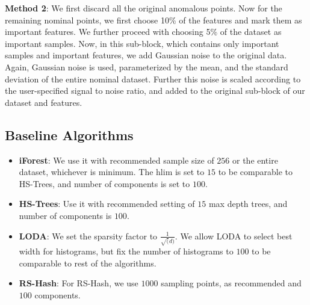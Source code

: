 \textbf{Method 2}: We first discard all the original anomalous points. Now for the remaining nominal points, we first choose 10\% of the features and mark them as important features. We further proceed with choosing 5\% of the dataset as important samples. Now, in this sub-block, which contains only important samples and important features, we add Gaussian noise to the original data. Again, Gaussian noise is used, parameterized by the mean, and the standard deviation of the entire nominal dataset. Further this noise is scaled according to the user-specified signal to noise ratio, and added to the original sub-block of our dataset and features.

\subsection{Baseline Algorithms}
\begin{itemize}
\item{\textbf{iForest}: We use it with recommended sample size of $256$ or the entire dataset, whichever is minimum. The hlim is set to $15$ to be comparable to HS-Trees, and number of components is set to $100$.}
\item{\textbf{HS-Trees}:  Use it with recommended setting of $15$ max depth trees, and number of components is $100$.}
\item{\textbf{LODA}: We set the sparsity factor to $\frac{1}{\sqrt(d)}$. We allow LODA to select best width for histograms, but fix the number of histograms to $100$ to be comparable to rest of the algorithms.}
\item{\textbf{RS-Hash}: For RS-Hash, we use $1000$ sampling points, as recommended and $100$ components.}
\end{itemize}

